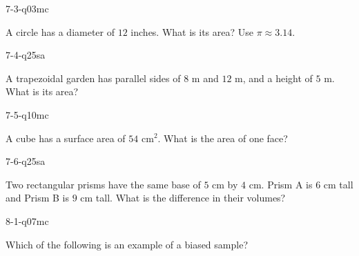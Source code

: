 \begin{practiceQuestion}{7-3-q03}{mc}
\begin{questionText}
A circle has a diameter of $12$ inches. What is its area? Use $\pi \approx 3.14$.
\end{questionText}
\end{practiceQuestion}

\begin{practiceQuestion}{7-4-q25}{sa}
\begin{questionText}
A trapezoidal garden has parallel sides of $8$ m and $12$ m, and a height of $5$ m. What is its area?
\end{questionText}
\end{practiceQuestion}

\begin{practiceQuestion}{7-5-q10}{mc}
\begin{questionText}
A cube has a surface area of $54$ cm$^2$. What is the area of one face?
\end{questionText}
\end{practiceQuestion}

\begin{practiceQuestion}{7-6-q25}{sa}
\begin{questionText}
Two rectangular prisms have the same base of $5$ cm by $4$ cm. Prism A is $6$ cm tall and Prism B is $9$ cm tall. What is the difference in their volumes?
\end{questionText}
\end{practiceQuestion}

\begin{practiceQuestion}{8-1-q07}{mc}
\begin{questionText}
Which of the following is an example of a biased sample?
\end{questionText}
\end{practiceQuestion}

